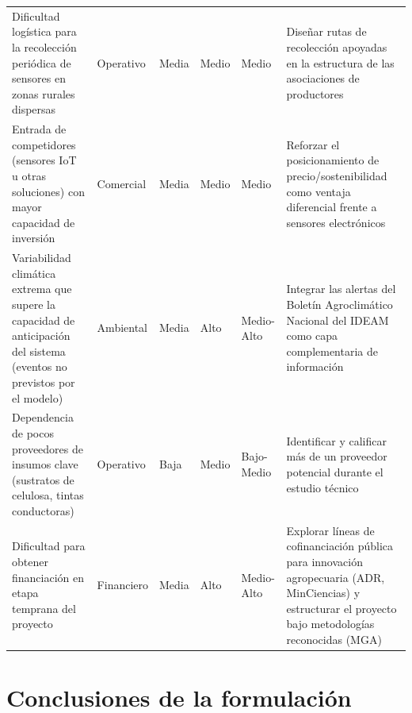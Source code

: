 \documentclass[11pt,a4paper]{article}
\begin{document}
\begin{longtable}{L{2.6cm}L{2.1cm}L{1.6cm}L{1.6cm}L{1.5cm}L{3.8cm}}
Dificultad logística para la recolección periódica de sensores en zonas rurales dispersas & Operativo & Media & Medio & Medio & Diseñar rutas de recolección apoyadas en la estructura de las asociaciones de productores\\
Entrada de competidores (sensores IoT u otras soluciones) con mayor capacidad de inversión & Comercial & Media & Medio & Medio & Reforzar el posicionamiento de precio/sostenibilidad como ventaja diferencial frente a sensores electrónicos\\
Variabilidad climática extrema que supere la capacidad de anticipación del sistema (eventos no previstos por el modelo) & Ambiental & Media & Alto & Medio-Alto & Integrar las alertas del Boletín Agroclimático Nacional del IDEAM como capa complementaria de información \citep{ideam_ban}\\
Dependencia de pocos proveedores de insumos clave (sustratos de celulosa, tintas conductoras) & Operativo & Baja & Medio & Bajo-Medio & Identificar y calificar más de un proveedor potencial durante el estudio técnico\\
Dificultad para obtener financiación en etapa temprana del proyecto & Financiero & Media & Alto & Medio-Alto & Explorar líneas de cofinanciación pública para innovación agropecuaria (ADR, MinCiencias) y estructurar el proyecto bajo metodologías reconocidas (MGA) \citep{dnp_mga2023}\\
\bottomrule
\end{longtable}

\section{Conclusiones de la formulación}
\end{document}
